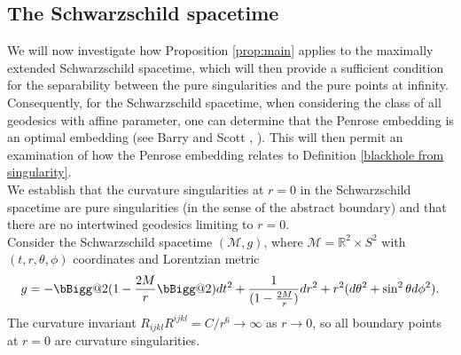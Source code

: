 \documentclass[pdflatex,sn-mathphys-num]{sn-jnl}
\makeatletter
\newcommand{\vast}{\bBigg@{2}}
\theoremstyle{definition}
\makeatother
\begin{document}
\subsection{The Schwarzschild spacetime}
We will now investigate how Proposition \ref{prop:main} applies to the maximally extended Schwarzschild spacetime, which will then provide a sufficient condition for the separability between the pure singularities and the pure points at infinity. Consequently, for the Schwarzschild spacetime, when considering the class of all geodesics with affine parameter, one can determine that the Penrose embedding is an optimal embedding (see Barry and Scott \cite{Barry_2014}, \cite{Barrythesis_2014}). This will then permit an examination of how the Penrose embedding relates to Definition \ref{blackhole from singularity}.\\

We establish that the curvature singularities at $r = 0$ in the Schwarzschild spacetime are pure singularities (in the sense of the abstract boundary) and that there are no intertwined geodesics limiting to $r = 0$. \\


Consider the Schwarzschild spacetime $(\mathcal{M},g)$, where $\mathcal{M} = \mathbb{R}^2 \times S^2$ with $(t,r,\theta,\phi)$ coordinates and Lorentzian metric
\begin{align*}
    g = -\vast(1-\frac{2M}{r}\vast)dt^2 + \frac{1}{(1-\frac{2M}{r})}dr^2 + r^2(d\theta^2 + \sin^2{\theta}d\phi^2).
\end{align*}
The curvature invariant $R_{ijkl}R^{ijkl} = C/r^6 \rightarrow \infty$ as $r \rightarrow 0$, so all boundary points at $r = 0$ are curvature singularities.\\
\end{document}
